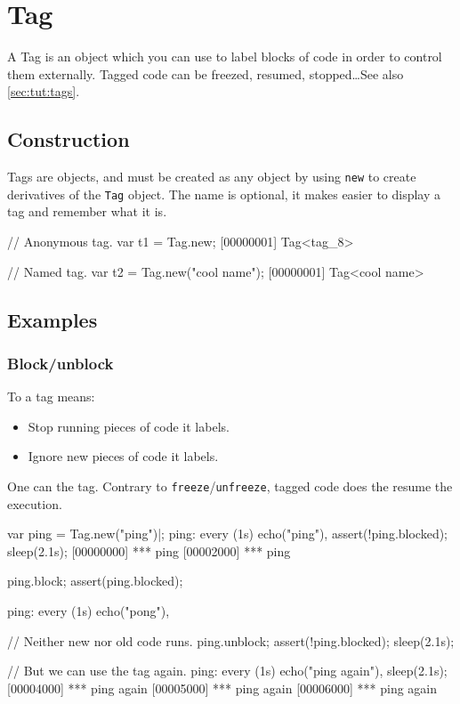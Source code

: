 \section{Tag}

A Tag is an object which you can use to label blocks of code in order
to control them externally.  Tagged code can be freezed, resumed,
stopped\ldots See also \autoref{sec:tut:tags}.

\subsection{Construction}
\label{stdlib:tag:ctor}

Tags are objects, and must be created as any object by using
\lstinline{new} to create derivatives of the \lstinline{Tag} object.
The name is optional, it makes easier to display a tag and remember
what it is.

\begin{urbiscript}
// Anonymous tag.
var t1 = Tag.new;
[00000001] Tag<tag_8>

// Named tag.
var t2 = Tag.new("cool name");
[00000001] Tag<cool name>
\end{urbiscript}

\subsection{Examples}

\subsubsection{Block/unblock}
\label{sec:specs:tag:block}

To  a tag means:
\begin{itemize}
\item Stop running pieces of code it labels.
\item Ignore new pieces of code it labels.
\end{itemize}

One can  the tag.  Contrary to
\lstinline|freeze|/\lstinline|unfreeze|, tagged code does the resume
the execution.


\begin{urbiscript}
var ping = Tag.new("ping")|;
ping:
  every (1s)
    echo("ping"),
assert(!ping.blocked);
sleep(2.1s);
[00000000] *** ping
[00002000] *** ping

ping.block;
assert(ping.blocked);

ping:
  every (1s)
    echo("pong"),

// Neither new nor old code runs.
ping.unblock;
assert(!ping.blocked);
sleep(2.1s);

// But we can use the tag again.
ping:
  every (1s)
    echo("ping again"),
sleep(2.1s);
[00004000] *** ping again
[00005000] *** ping again
[00006000] *** ping again
\end{urbiscript}


